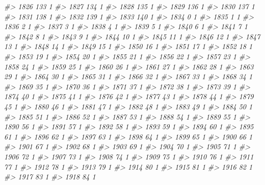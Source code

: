 \documentclass[]{article}
\newenvironment{Shaded}{\begin{snugshade}}{\end{snugshade}}
\newcommand{\CommentTok}[1]{\textcolor[rgb]{0.56,0.35,0.01}{\textit{#1}}}
\begin{document}
\begin{Shaded}
\begin{Highlighting}[]
\CommentTok{#> 1826 133  1}
\CommentTok{#> 1827 134  1}
\CommentTok{#> 1828 135  1}
\CommentTok{#> 1829 136  1}
\CommentTok{#> 1830 137  1}
\CommentTok{#> 1831 138  1}
\CommentTok{#> 1832 139  1}
\CommentTok{#> 1833 140  1}
\CommentTok{#> 1834   0  1}
\CommentTok{#> 1835   1  1}
\CommentTok{#> 1836   2  1}
\CommentTok{#> 1837   3  1}
\CommentTok{#> 1838   4  1}
\CommentTok{#> 1839   5  1}
\CommentTok{#> 1840   6  1}
\CommentTok{#> 1841   7  1}
\CommentTok{#> 1842   8  1}
\CommentTok{#> 1843   9  1}
\CommentTok{#> 1844  10  1}
\CommentTok{#> 1845  11  1}
\CommentTok{#> 1846  12  1}
\CommentTok{#> 1847  13  1}
\CommentTok{#> 1848  14  1}
\CommentTok{#> 1849  15  1}
\CommentTok{#> 1850  16  1}
\CommentTok{#> 1851  17  1}
\CommentTok{#> 1852  18  1}
\CommentTok{#> 1853  19  1}
\CommentTok{#> 1854  20  1}
\CommentTok{#> 1855  21  1}
\CommentTok{#> 1856  22  1}
\CommentTok{#> 1857  23  1}
\CommentTok{#> 1858  24  1}
\CommentTok{#> 1859  25  1}
\CommentTok{#> 1860  26  1}
\CommentTok{#> 1861  27  1}
\CommentTok{#> 1862  28  1}
\CommentTok{#> 1863  29  1}
\CommentTok{#> 1864  30  1}
\CommentTok{#> 1865  31  1}
\CommentTok{#> 1866  32  1}
\CommentTok{#> 1867  33  1}
\CommentTok{#> 1868  34  1}
\CommentTok{#> 1869  35  1}
\CommentTok{#> 1870  36  1}
\CommentTok{#> 1871  37  1}
\CommentTok{#> 1872  38  1}
\CommentTok{#> 1873  39  1}
\CommentTok{#> 1874  40  1}
\CommentTok{#> 1875  41  1}
\CommentTok{#> 1876  42  1}
\CommentTok{#> 1877  43  1}
\CommentTok{#> 1878  44  1}
\CommentTok{#> 1879  45  1}
\CommentTok{#> 1880  46  1}
\CommentTok{#> 1881  47  1}
\CommentTok{#> 1882  48  1}
\CommentTok{#> 1883  49  1}
\CommentTok{#> 1884  50  1}
\CommentTok{#> 1885  51  1}
\CommentTok{#> 1886  52  1}
\CommentTok{#> 1887  53  1}
\CommentTok{#> 1888  54  1}
\CommentTok{#> 1889  55  1}
\CommentTok{#> 1890  56  1}
\CommentTok{#> 1891  57  1}
\CommentTok{#> 1892  58  1}
\CommentTok{#> 1893  59  1}
\CommentTok{#> 1894  60  1}
\CommentTok{#> 1895  61  1}
\CommentTok{#> 1896  62  1}
\CommentTok{#> 1897  63  1}
\CommentTok{#> 1898  64  1}
\CommentTok{#> 1899  65  1}
\CommentTok{#> 1900  66  1}
\CommentTok{#> 1901  67  1}
\CommentTok{#> 1902  68  1}
\CommentTok{#> 1903  69  1}
\CommentTok{#> 1904  70  1}
\CommentTok{#> 1905  71  1}
\CommentTok{#> 1906  72  1}
\CommentTok{#> 1907  73  1}
\CommentTok{#> 1908  74  1}
\CommentTok{#> 1909  75  1}
\CommentTok{#> 1910  76  1}
\CommentTok{#> 1911  77  1}
\CommentTok{#> 1912  78  1}
\CommentTok{#> 1913  79  1}
\CommentTok{#> 1914  80  1}
\CommentTok{#> 1915  81  1}
\CommentTok{#> 1916  82  1}
\CommentTok{#> 1917  83  1}
\CommentTok{#> 1918  84  1}

\end{Highlighting}
\end{Shaded}
\end{document}
